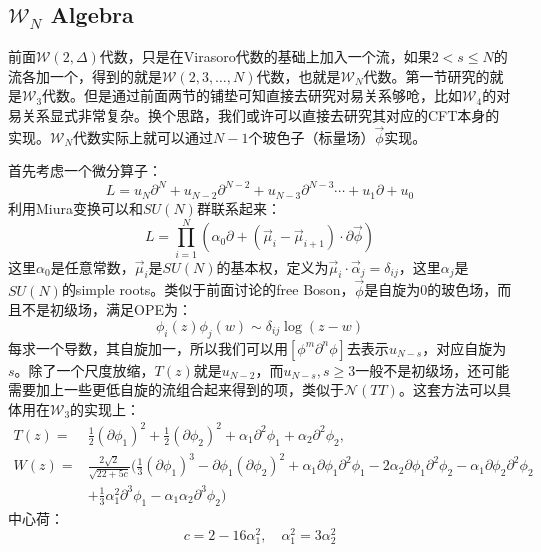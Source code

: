 \subsection{$\mathcal{W}_N$ Algebra}
前面$\mathcal{W}(2,\Delta)$代数，只是在Virasoro代数的基础上加入一个流，如果$2<s\leq N$的流各加一个，得到的就是$\mathcal{W}(2,3,\ldots,N)$代数，也就是$\mathcal{W}_N$代数。第一节研究的就是$\mathcal{W}_3$代数。但是通过前面两节的铺垫可知直接去研究对易关系够呛，比如$\mathcal{W}_4$的对易关系显式\cite{Kausch:1990bn,Blumenhagen:1990jv}非常复杂。换个思路，我们或许可以直接去研究其对应的CFT本身的实现。$\mathcal{W}_N$代数实际上就可以通过$N-1$个玻色子（标量场）$\vec{\phi}$实现。

首先考虑一个微分算子：
\begin{equation}
	L=u_N\partial^N+u_{N-2}\partial^{N-2}+u_{N-3}\partial^{N-3}\cdots+u_1\partial+u_0
\end{equation}
利用Miura变换可以和$SU(N)$群联系起来：
\begin{equation}
	L=\prod_{i=1}^N\left(\alpha_0\partial+(\vec{\mu}_i-\vec{\mu}_{i+1})\cdot\partial\vec{\phi}\right)
\end{equation}
这里$\alpha_0$是任意常数，$\vec{\mu}_i$是$SU(N)$的基本权，定义为$\vec{\mu}_i\cdot\vec{\alpha}_j=\delta_{ij}$，这里$\alpha_j$是$SU(N)$的simple roots。类似于前面讨论的free Boson，$\vec{\phi}$是自旋为0的玻色场，而且不是初级场，满足OPE为：
\begin{equation}
	\phi_i(z)\phi_j(w)\sim\delta_{ij}\log(z-w)
\end{equation}
每求一个导数，其自旋加一，所以我们可以用$[\phi^m\partial^n\phi]$去表示$u_{N-s}$，对应自旋为$s$。除了一个尺度放缩，$T(z)$就是$u_{N-2}$，而$u_{N-s},s\geq 3$一般不是初级场，还可能需要加上一些更低自旋的流组合起来得到的项，类似于$\mathcal{N}(TT)$。这套方法可以具体用在$\mathcal{W}_3$的实现上：
\begin{equation}
	\begin{aligned}
		T(z) =&\frac12(\partial\phi_1)^2+\frac12(\partial\phi_2)^2+\alpha_1\partial^2\phi_1+\alpha_2\partial^2\phi_2,  \\
		W(z) =&\frac{2\sqrt{2}}{\sqrt{22+5c}}\Big(\frac{1}{3}(\partial\phi_{1})^{3}-\partial\phi_{1}(\partial\phi_{2})^{2}+\alpha_{1}\partial\phi_{1}\partial^{2}\phi_{1}-2\alpha_{2}\partial\phi_{1}\partial^{2}\phi_{2}-\alpha_{1}\partial\phi_{2}\partial^{2}\phi_{2}  \\
		&+\frac13\alpha_1^2\partial^3\phi_1-\alpha_1\alpha_2\partial^3\phi_2\Big)
	\end{aligned}
\end{equation}
中心荷：
\begin{equation}
	c=2-16\alpha_1^2,\quad \alpha_1^2=3\alpha_2^2
\end{equation}

